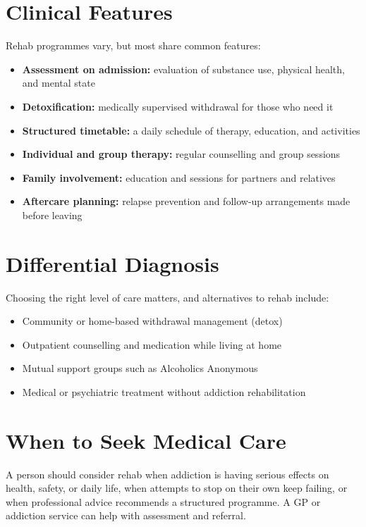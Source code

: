 \section*{Clinical Features}
Rehab programmes vary, but most share common features:

\begin{itemize}
    \item \textbf{Assessment on admission:} evaluation of substance use, physical health, and mental state
    \item \textbf{Detoxification:} medically supervised withdrawal for those who need it
    \item \textbf{Structured timetable:} a daily schedule of therapy, education, and activities
    \item \textbf{Individual and group therapy:} regular counselling and group sessions
    \item \textbf{Family involvement:} education and sessions for partners and relatives
    \item \textbf{Aftercare planning:} relapse prevention and follow-up arrangements made before leaving
\end{itemize}

\section*{Differential Diagnosis}
Choosing the right level of care matters, and alternatives to rehab include:

\begin{itemize}
    \item Community or home-based withdrawal management (detox)
    \item Outpatient counselling and medication while living at home
    \item Mutual support groups such as Alcoholics Anonymous
    \item Medical or psychiatric treatment without addiction rehabilitation
\end{itemize}

\section*{When to Seek Medical Care}
A person should consider rehab when addiction is having serious effects on health, safety, or daily life, when attempts to stop on their own keep failing, or when professional advice recommends a structured programme. A GP or addiction service can help with assessment and referral.

